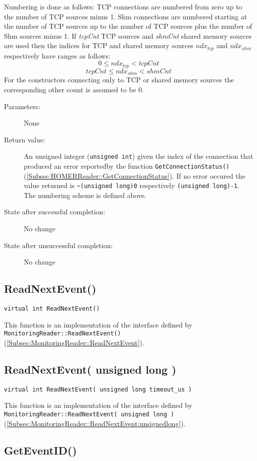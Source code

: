 \documentclass[a4paper,twoside]{article}
\begin{document}
Numbering is done as follows: TCP connections are numbered from zero up to the number of TCP sources minus 1. Shm connections are numbered
starting at the number of TCP sources up to the number of TCP sources plus the number of Shm sources minus 1. If {\em tcpCnt} TCP sources and
{\em shmCnt} shared memory sources are used then the indices for TCP and shared memory sources $ndx_{tcp}$ and $ndx_{shm}$ 
respectively have ranges as follows:
$$ 0 \le ndx_{tcp} < tcpCnt $$
$$ tcpCnt \le ndx_{shm} < shmCnt $$
For the constructors connecting only to TCP or shared memory sources the corresponding other count is assumed to be 0.

\begin{description}
\item[Parameters:] None
\item[Return value:] An unsigned integer (\texttt{unsigned int}) given the index of the connection that produced an error reportedby the function \texttt{GetConnectionStatus()}
(\ref{Subsec:HOMERReader::GetConnectionStatus}). If no error occured the value returned is \texttt{\~{ }(unsigned long)0} respectively \texttt{(unsigned long)-1}. The numbering scheme is defined above.
\item[State after successful completion:] No change
\item[State after unsuccessful completion:] No change
\end{description}


\subsection{ReadNextEvent()}

\texttt{virtual int ReadNextEvent()}

This function is an implementation of the interface defined by \texttt{MonitoringReader::ReadNextEvent()} (\ref{Subsec:MonitoringReader::ReadNextEvent}).


\subsection{ReadNextEvent( unsigned long )}

\texttt{virtual int ReadNextEvent( unsigned long timeout\_us )}

This function is an implementation of the interface defined by \texttt{MonitoringReader::ReadNextEvent( unsigned long )} (\ref{Subsec:MonitoringReader::ReadNextEvent:unsignedlong}).


\subsection{GetEventID()}
\end{document}
